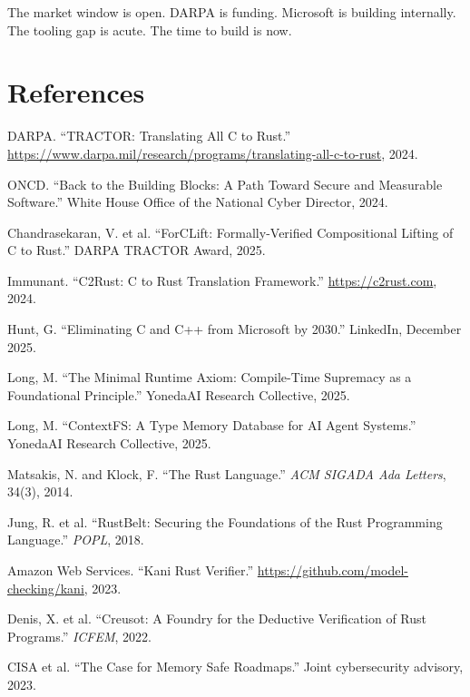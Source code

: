 \documentclass[11pt,a4paper]{article}
\theoremstyle{definition}
\theoremstyle{remark}
\begin{document}
The market window is open. DARPA is funding. Microsoft is building internally. The tooling gap is acute. The time to build is now.


\section*{References}

\begin{enumerate}[leftmargin=2em, label={[\arabic*]}]
\item DARPA. ``TRACTOR: Translating All C to Rust.'' \url{https://www.darpa.mil/research/programs/translating-all-c-to-rust}, 2024.
\item ONCD. ``Back to the Building Blocks: A Path Toward Secure and Measurable Software.'' White House Office of the National Cyber Director, 2024.
\item Chandrasekaran, V. et al. ``ForCLift: Formally-Verified Compositional Lifting of C to Rust.'' DARPA TRACTOR Award, 2025.
\item Immunant. ``C2Rust: C to Rust Translation Framework.'' \url{https://c2rust.com}, 2024.
\item Hunt, G. ``Eliminating C and C++ from Microsoft by 2030.'' LinkedIn, December 2025.
\item Long, M. ``The Minimal Runtime Axiom: Compile-Time Supremacy as a Foundational Principle.'' YonedaAI Research Collective, 2025.
\item Long, M. ``ContextFS: A Type Memory Database for AI Agent Systems.'' YonedaAI Research Collective, 2025.
\item Matsakis, N. and Klock, F. ``The Rust Language.'' \textit{ACM SIGADA Ada Letters}, 34(3), 2014.
\item Jung, R. et al. ``RustBelt: Securing the Foundations of the Rust Programming Language.'' \textit{POPL}, 2018.
\item Amazon Web Services. ``Kani Rust Verifier.'' \url{https://github.com/model-checking/kani}, 2023.
\item Denis, X. et al. ``Creusot: A Foundry for the Deductive Verification of Rust Programs.'' \textit{ICFEM}, 2022.
\item CISA et al. ``The Case for Memory Safe Roadmaps.'' Joint cybersecurity advisory, 2023.
\end{enumerate}
\end{document}
